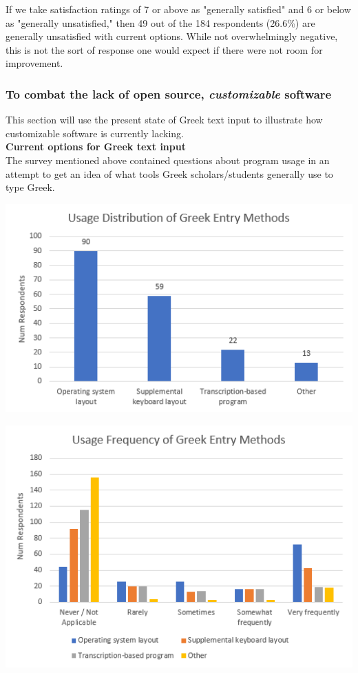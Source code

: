 \documentclass[11pt]{article}
\begin{document}
If we take satisfaction ratings of 7 or above as "generally satisfied" and 6 or below as "generally unsatisfied," then 49 out of the 184 respondents (26.6\%) are generally unsatisfied with current options. While not overwhelmingly negative, this is not the sort of response one would expect if there were not room for improvement.

\subsubsection{To combat the lack of open source, \emph{customizable} software}
\label{sec:orgdfe1aa8}

This section will use the present state of Greek text input to illustrate how customizable software is currently lacking. \\

\noindent \textbf{Current options for Greek text input} \\

The survey mentioned above contained questions about program usage in an attempt to get an idea of what tools Greek scholars/students generally use to type Greek.

\begin{center}
\includegraphics[width=.9\linewidth]{./images/entry-methods.PNG}
\end{center}

\begin{center}
\includegraphics[width=.9\linewidth]{./images/entry-method-usage-distribution.PNG}
\end{center}
\end{document}
